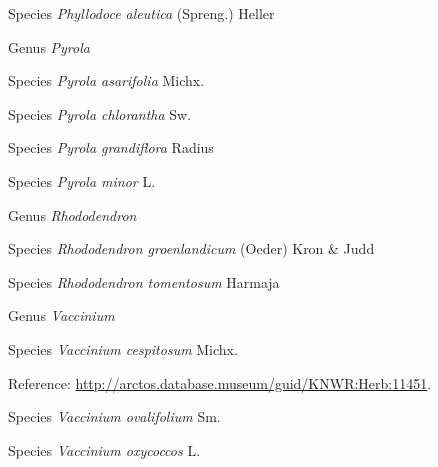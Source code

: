 \documentclass[9pt, article]{memoir}
\begin{document}
\begin{multicols}{2}
\vspace{6pt}\noindent\hspace{36pt}Species \textit{Phyllodoce aleutica} (Spreng.) Heller


\vspace{6pt}\noindent\hspace{30pt}Genus \textit{Pyrola}


\vspace{6pt}\noindent\hspace{36pt}Species \textit{Pyrola asarifolia} Michx.


\vspace{6pt}\noindent\hspace{36pt}Species \textit{Pyrola chlorantha} Sw.


\vspace{6pt}\noindent\hspace{36pt}Species \textit{Pyrola grandiflora} Radius


\vspace{6pt}\noindent\hspace{36pt}Species \textit{Pyrola minor} L.


\vspace{6pt}\noindent\hspace{30pt}Genus \textit{Rhododendron}


\vspace{6pt}\noindent\hspace{36pt}Species \textit{Rhododendron groenlandicum} (Oeder) Kron \& Judd


\vspace{6pt}\noindent\hspace{36pt}Species \textit{Rhododendron tomentosum} Harmaja


\vspace{6pt}\noindent\hspace{30pt}Genus \textit{Vaccinium}


\vspace{6pt}\noindent\hspace{36pt}Species \textit{Vaccinium cespitosum} Michx.


\vspace{6pt}Reference: 
\url{http://arctos.database.museum/guid/KNWR:Herb:11451}.

\vspace{6pt}\noindent\hspace{36pt}Species \textit{Vaccinium ovalifolium} Sm.


\vspace{6pt}\noindent\hspace{36pt}Species \textit{Vaccinium oxycoccos} L.



\end{multicols}
\end{document}
